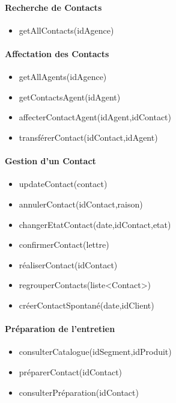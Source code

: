 \paragraph{Recherche de Contacts}

\begin{itemize}
\item getAllContacts(idAgence)
\end{itemize}

\paragraph{Affectation des Contacts}

\begin{itemize}
\item getAllAgents(idAgence)
\item getContactsAgent(idAgent)
\item affecterContactAgent(idAgent,idContact)
\item transférerContact(idContact,idAgent)
\end{itemize}

\paragraph{Gestion d'un Contact}

\begin{itemize}
\item updateContact(contact)
\item annulerContact(idContact,raison)
\item changerEtatContact(date,idContact,etat)
\item confirmerContact(lettre)
\item réaliserContact(idContact)
\item regrouperContacts(liste<Contact>)
\item créerContactSpontané(date,idClient)
\end{itemize}

\paragraph{Préparation de l'entretien}

\begin{itemize}
\item consulterCatalogue(idSegment,idProduit)
\item préparerContact(idContact)
\item consulterPréparation(idContact)
\end{itemize}

